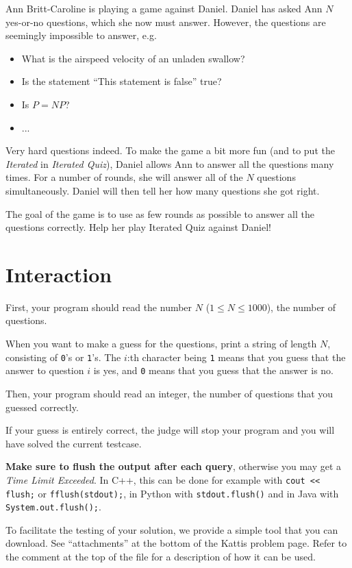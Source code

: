 Ann Britt-Caroline is playing a game against Daniel. Daniel has asked Ann $N$ yes-or-no questions, which she now must answer.
However, the questions are seemingly impossible to answer, e.g.
\begin{itemize}
  \item What is the airspeed velocity of an unladen swallow?
  \item Is the statement ``This statement is false'' true?
  \item Is $P = NP$?
  \item ...
\end{itemize}
Very hard questions indeed. To make the game a bit more fun (and to put the \emph{Iterated} in \emph{Iterated Quiz}), Daniel allows Ann to answer all the questions
many times. For a number of rounds, she will answer all of the $N$ questions simultaneously. Daniel will then tell her how many questions she got right.

The goal of the game is to use as few rounds as possible to answer all the questions correctly.
Help her play Iterated Quiz against Daniel!


\section*{Interaction}
First, your program should read the number $N$ ($1 \leq N \leq 1000$), the number of questions.

When you want to make a guess for the questions, print a string of length $N$, consisting of \texttt{0}'s or \texttt{1}'s.
The $i$:th character being \texttt{1} means that you guess that the answer to question $i$ is yes, and \texttt{0} means
that you guess that the answer is no.

Then, your program should read an integer, the number of questions that you guessed correctly.

If your guess is entirely correct, the judge will stop your program and you will have solved the current
testcase.

\textbf{Make sure to flush the output after each query}, otherwise you may get a \textit{Time Limit Exceeded}.
In C++, this can be done for example with \texttt{cout << flush;}
or \texttt{fflush(stdout);},
in Python with \texttt{stdout.flush()}
and in Java with \texttt{System.out.flush();}.

To facilitate the testing of your solution, we provide a simple tool that you can download. See ``attachments''
at the bottom of the Kattis problem page. Refer to the comment at the top of the file for a description of how it can be used.


